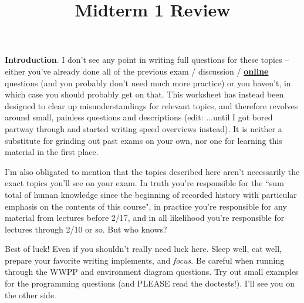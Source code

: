 \documentclass[twoside]{article}
\title{\sc Midterm 1 Review}
\begin{document}
\thispagestyle{empty}
\maketitle

\textbf{Introduction}. I don't see any point in writing full questions for these topics -- either you've already done all of the previous exam / discussion / \textbf{\href{http://albertwu.org/cs61a/review/}{online}} questions (and you probably don't need much more practice) or you haven't, in which case you should probably get on that. This worksheet has instead been designed to clear up misunderstandings for relevant topics, and therefore revolves around small, painless questions and descriptions (edit: ...until I got bored partway through and started writing speed overviews instead). It is neither a substitute for grinding out past exams on your own, nor one for learning this material in the first place.

I'm also obligated to mention that the topics described here aren't necessarily the exact topics you'll see on your exam. In truth you're responsible for the ``sum total of human knowledge since the beginning of recorded history with particular emphasis on the contents of this course", in practice you're responsible for any material from lectures before 2/17, and in all likelihood you're responsible for lectures through 2/10 or so. But who knows?

Best of luck! Even if you shouldn't really need luck here. Sleep well, eat well, prepare your favorite writing implements, and \textit{focus}. Be careful when running through the WWPP and environment diagram questions. Try out small examples for the programming questions (and PLEASE read the doctests!). I'll see you on the other side.
\end{document}
